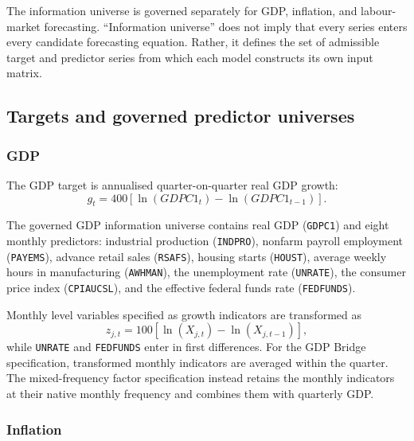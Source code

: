 The information universe is governed separately for GDP, inflation, and
labour-market forecasting. ``Information universe'' does not imply that every
series enters every candidate forecasting equation. Rather, it defines the
set of admissible target and predictor series from which each model constructs
its own input matrix.

\subsection{Targets and governed predictor universes}
\label{subsec:gdp_data}

\subsubsection{GDP}

The GDP target is annualised quarter-on-quarter real GDP growth:
\begin{equation}
    g_t
    =
    400
    \left[
        \ln(GDPC1_t)-\ln(GDPC1_{t-1})
    \right].
    \label{eq:gdp_growth}
\end{equation}

The governed GDP information universe contains real GDP (\texttt{GDPC1}) and
eight monthly predictors: industrial production (\texttt{INDPRO}), nonfarm
payroll employment (\texttt{PAYEMS}), advance retail sales (\texttt{RSAFS}),
housing starts (\texttt{HOUST}), average weekly hours in manufacturing
(\texttt{AWHMAN}), the unemployment rate (\texttt{UNRATE}), the consumer
price index (\texttt{CPIAUCSL}), and the effective federal funds rate
(\texttt{FEDFUNDS}).

Monthly level variables specified as growth indicators are transformed as
\begin{equation}
    z_{j,t}
    =
    100
    \left[
        \ln(X_{j,t})-\ln(X_{j,t-1})
    \right],
    \label{eq:monthly_log_growth}
\end{equation}
while \texttt{UNRATE} and \texttt{FEDFUNDS} enter in first differences.
For the GDP Bridge specification, transformed monthly indicators are averaged
within the quarter. The mixed-frequency factor specification instead retains
the monthly indicators at their native monthly frequency and combines them
with quarterly GDP.

\subsubsection{Inflation}
\label{subsec:inflation_data}

